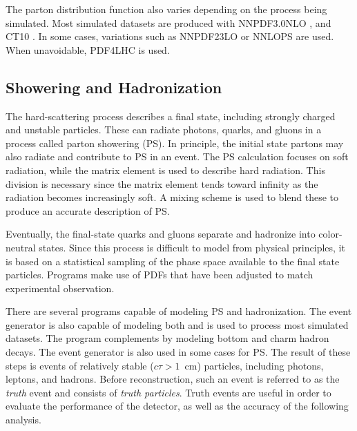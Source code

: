The parton distribution function also varies depending on the process being simulated.
Most simulated datasets are produced with NNPDF3.0NLO \cite{Ball:2014uwa}, and CT10 \cite{ct10}.
In some cases, variations such as NNPDF23LO \cite{Ball:2012cx} or NNLOPS \cite{Hamilton:2013fea} are used.
When unavoidable, PDF4LHC \cite{Butterworth:2015oua} is used.




\subsection{Showering and Hadronization} \label{sec:hadronization}

The hard-scattering process describes a final state, including strongly charged and unstable particles.
These can radiate photons, quarks, and gluons in a process called parton showering (PS).
In principle, the initial state partons may also radiate and contribute to PS in an event.
The PS calculation focuses on soft radiation, while the matrix element is used to describe hard radiation.
This division is necessary since the matrix element tends toward infinity as the radiation becomes increasingly soft.
A mixing scheme is used to blend these to produce an accurate description of PS.

Eventually, the final-state quarks and gluons separate and hadronize into color-neutral states.
Since this process is difficult to model from physical principles, it is based on a statistical sampling of the phase space available to the final state particles.
Programs make use of PDFs that have been adjusted to match experimental observation.

There are several programs capable of modeling PS and hadronization.
The event generator \pythia is also capable of modeling both and is used to process most simulated datasets.
The program \evtgen \cite{Lange:2001uf} complements \pythia by modeling bottom and charm hadron decays.
The event generator \sherpa is also used in some cases for PS.
The result of these steps is events of relatively stable ($c\tau>1$~cm) particles, including photons, leptons, and hadrons.
Before reconstruction, such an event is referred to as the \emph{truth} event and consists of \emph{truth particles}.
Truth events are useful in order to evaluate the performance of the detector, as well as the accuracy of the following analysis.


